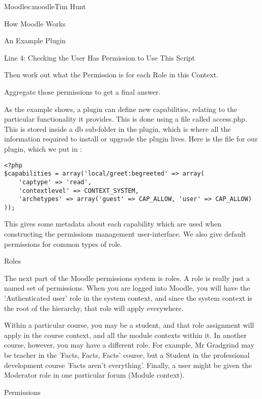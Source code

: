 \begin{aosachapter}{Moodle}{s:moodle}{Tim Hunt}
\begin{aosasect1}{How Moodle Works}
\begin{aosasect2}{An Example Plugin}
\begin{aosasect3}{Line 4: Checking the User Has Permission to Use This Script}
\begin{aosaenumerate}
\item Then work out what the Permission is for each Role in this
  Context.

\item Aggregate those permissions to get a final answer.

\end{aosaenumerate}

As the example shows, a plugin can define new capabilities, relating
to the particular functionality it provides. This is done using a file
called access.php. This is stored inside a db sub-folder in the
plugin, which is where all the information required to install or
upgrade the plugin lives. Here is the  file for our
plugin, which we put in :

\begin{verbatim}
<?php
$capabilities = array('local/greet:begreeted' => array(
    'captype' => 'read',
    'contextlevel' => CONTEXT_SYSTEM,
    'archetypes' => array('guest' => CAP_ALLOW, 'user' => CAP_ALLOW)
));
\end{verbatim}

This gives some metadata about each capability which are used when
constructing the permissions management user-interface. We also give
default permissions for common types of role.

\end{aosasect3}

\begin{aosasect3}{Roles}

The next part of the Moodle permissions system is roles. A role is
really just a named set of permissions. When you are logged into
Moodle, you will have the 'Authenticated user' role in the system
context, and since the system context is the root of the hierarchy,
that role will apply everywhere.

Within a particular course, you may be a student, and that role
assignment will apply in the course context, and all the module
contexts within it. In another course, however, you may have a
different role. For example, Mr Gradgrind may be teacher in the
'Facts, Facts, Facts' course, but a Student in the professional
development course 'Facts aren't everything'. Finally, a user might be
given the Moderator role in one particular forum (Module context).

\end{aosasect3}

\begin{aosasect3}{Permissions}


\end{aosasect3}
\end{aosasect2}
\end{aosasect1}
\end{aosachapter}
